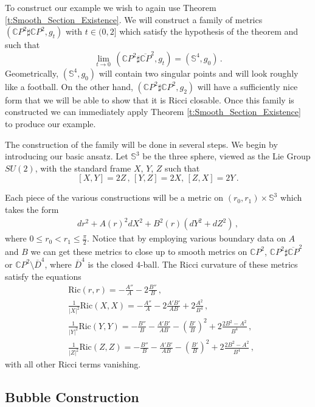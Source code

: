 \documentclass[11pt]{article}
\newcommand{\Ric}{\text{Ric}}
\newcommand{\CC}{\mathds{C}}
\newcommand{\Sn}{\mathds{S}}
\begin{document}
To construct our example we wish to again use Theorem \ref{t:Smooth_Section_Existence}.  We will construct a family of metrics $(\mathds{C}P^2\sharp \mathds{C}P^2,g_t)$ with $t\in (0,2]$ which satisfy the hypothesis of the theorem and such that
$$\lim_{t\rightarrow 0}\,(\mathds{C}P^2\sharp \overline{\CC P}^2,g_t) = (\Sn^4,g_0)\, .$$
Geometrically, $(\Sn^4,g_0)$ will contain two singular points and will look roughly like a football.  On the other hand, $(\mathds{C}P^2\sharp \mathds{C}P^2,g_2)$ will have a sufficiently nice form that we will be able to show that it is Ricci closable.  Once this family is constructed we can immediately apply Theorem \ref{t:Smooth_Section_Existence} to produce our example.

The construction of the family will be done in several steps.  We begin by introducing our basic ansatz.  Let $\Sn^3$ be the three sphere, viewed as the Lie Group $SU(2)$, with the standard frame $X$, $Y$, $Z$ such that
$$
[X,Y]=2Z\,, \,[Y,Z]=2X,\, [Z,X]=2Y\, .
$$

Each piece of the various constructions will be a metric on $(r_0,r_1)\times \Sn^3$ which takes the form
\begin{align}
 dr^2 + A(r)^2dX^2 + B^2(r)\left(dY^2+dZ^2\right)\, ,
\end{align}
where $0\leq r_0<r_1\leq \frac{\pi}{2}$.  Notice that by employing various boundary data on $A$ and $B$ we can get these metrics to close up to smooth metrics on $\mathds{C}P^2$, $\mathds{C}P^2\sharp \overline{\mathds{C}P}^2$ or $\mathds{C}P^2\setminus \overline D^4$, where $\overline D^4$ is the closed $4$-ball.  The Ricci curvature of these metrics satisfy the equations
\begin{align}\label{e:ricci}
&\Ric(r,r) = -\frac{A''}{A}-2\frac{B''}{B}\, ,\\
&\frac{1}{|X|^2}\Ric(X,X) = -\frac{A''}{A}-2\frac{A'B'}{AB}+2\frac{A^2}{B^4}\, , \\
&\frac{1}{|Y|^2}\Ric(Y,Y) = -\frac{B''}{B}-\frac{A'B'}{AB}-\left(\frac{B'}{B}\right)^2+2\frac{2B^2-A^2}{B^4}\, , \\
&\frac{1}{|Z|^2}\Ric(Z,Z) = -\frac{B''}{B}-\frac{A'B'}{AB}-\left(\frac{B'}{B}\right)^2+2\frac{2B^2-A^2}{B^4}\, , 
\end{align}
with all other Ricci terms vanishing.

\subsection{Bubble Construction}
\end{document}
